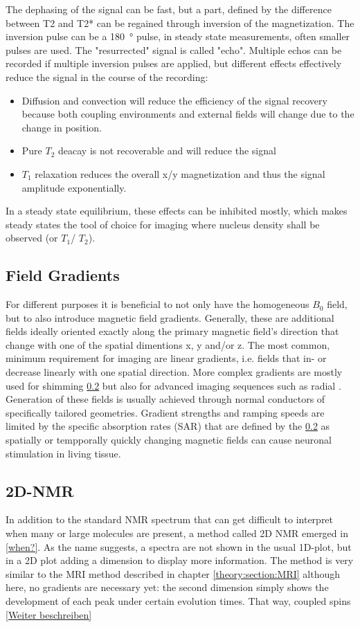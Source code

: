         The dephasing of the signal can be fast, but a part, defined by the difference between T2 and T2* can be regained through inversion of the magnetization. The inversion pulse can be a \SI{180}{\degree} pulse, in steady state measurements, often smaller pulses are used. The "resurrected" signal is called "echo". Multiple echos can be recorded if multiple inversion pulses are applied, but different effects effectively reduce the signal in the course of the recording:
        \begin{itemize}
            \item Diffusion and convection will reduce the efficiency of the signal recovery because both coupling environments and external fields will change due to the change in position.
            \item Pure $T_2$ deacay is not recoverable and will reduce the signal
            \item $T_1$ relaxation reduces the overall x/y magnetization and thus the signal amplitude exponentially.
        \end{itemize}
        In a steady state equilibrium, these effects can be inhibited mostly, which makes steady states the tool of choice for imaging where nucleus density shall be observed (or $T_1$/ $T_2$).
        \subsection{Field Gradients}
        For different purposes it is beneficial to not only have the homogeneous $B_0$ field, but to also introduce magnetic field gradients. Generally, these are additional fields ideally oriented exactly along the primary magnetic field's direction that change with one of the spatial dimentions x, y and/or z. The most common, minimum requirement for imaging are linear gradients, i.e. fields that in- or decrease linearly with one spatial direction. More complex gradients are mostly used for shimming \ref{} but also for advanced imaging sequences such as radial . Generation of these fields is usually achieved through normal conductors of specifically tailored geometries. Gradient strengths and ramping speeds are limited by the specific absorption rates (SAR) that are defined by the \ref{} as spatially or tempporally quickly changing magnetic fields can cause neuronal stimulation in living tissue.
        \subsection{2D-NMR}
        In addition to the standard NMR spectrum that can get difficult to interpret when many or large molecules are present, a method called 2D NMR emerged in \ref{when?}. As the name suggests, a spectra are not shown in the usual 1D-plot, but in a 2D plot adding a dimension to display more information. The method is very similar to the MRI method described in chapter \ref{theory:section:MRI} although here, no gradients are necessary yet: the second dimension simply shows the development of each peak under certain evolution times. That way, coupled spins \ref{Weiter beschreiben}
